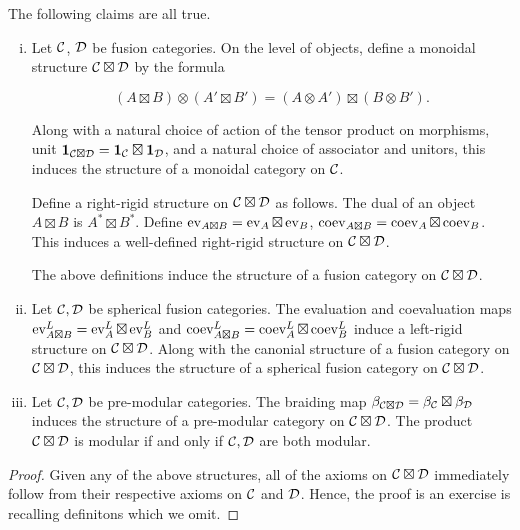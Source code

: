 \begin{prop} The following claims are all true.

\begin{enumerate}[(i)]
\item Let ${\mathcal C}$, ${\mathcal D}$ be fusion categories. On the level of objects, define a monoidal structure ${\mathcal C}\boxtimes {\mathcal D}$ by the formula

$$(A\boxtimes B)\otimes (A'\boxtimes B')= (A\otimes A')\boxtimes (B\otimes B').$$

Along with a natural choice of action of the tensor product on morphisms, unit ${\mathbf 1}_{{\mathcal C}\boxtimes {\mathcal D}}={\mathbf 1}_{{\mathcal C}}\boxtimes {\mathbf 1}_{{\mathcal D}}$, and a natural choice of associator and unitors, this induces the structure of a monoidal category on ${\mathcal C}$.

Define a right-rigid structure on ${\mathcal C}\boxtimes {\mathcal D}$ as follows. The dual of an object $A\boxtimes B$ is $A^*\boxtimes B^*$. Define $\operatorname{ev}_{A\boxtimes B}=\operatorname{ev}_{A}\boxtimes \operatorname{ev}_{B}$, $\operatorname{coev}_{A\boxtimes B}= \operatorname{coev}_{A}\boxtimes \operatorname{coev}_{B}$. This induces a well-defined right-rigid structure on ${\mathcal C}\boxtimes {\mathcal D}$.

The above definitions induce the structure of a fusion category on ${\mathcal C}\boxtimes {\mathcal D}$. 

\item Let ${\mathcal C},{\mathcal D}$ be spherical fusion categories. The evaluation and coevaluation maps $\operatorname{ev}^{L}_{A\boxtimes B} = \operatorname{ev}^{L}_{A}\boxtimes \operatorname{ev}^{L}_B$ and $\operatorname{coev}^{L}_{A\boxtimes B}=\operatorname{coev}^{L}_{A}\boxtimes \operatorname{coev}^{L}_{B}$ induce a left-rigid structure on ${\mathcal C}\boxtimes {\mathcal D}$. Along with the canonial structure of a fusion category on ${\mathcal C}\boxtimes {\mathcal D}$, this induces the structure of a spherical fusion category on ${\mathcal C}\boxtimes {\mathcal D}$.

\item Let ${\mathcal C},{\mathcal D}$ be pre-modular categories. The braiding map $\beta_{{\mathcal C}\boxtimes {\mathcal D}}=\beta_{{\mathcal C}}\boxtimes \beta_{{\mathcal D}}$ induces the structure of a pre-modular category on ${\mathcal C}\boxtimes {\mathcal D}$. The product ${\mathcal C}\boxtimes {\mathcal D}$ is modular if and only if ${\mathcal C},{\mathcal D}$ are both modular.
\end{enumerate}
\end{prop}
\begin{proof} Given any of the above structures, all of the axioms on ${\mathcal C}\boxtimes {\mathcal D}$ immediately follow from their respective axioms on ${\mathcal C}$ and ${\mathcal D}$. Hence, the proof is an exercise is recalling definitons which we omit.
\end{proof}

